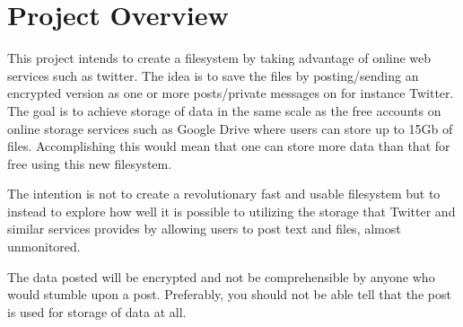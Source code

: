 \section{Project Overview}

This project intends to create a filesystem by taking advantage of online web services such as twitter. The idea is to save the files by posting/sending an encrypted version as one or more posts/private messages on for instance Twitter. The goal is to achieve storage of data in the same scale as the free accounts on online storage services such as Google Drive where users can store up to 15Gb of files. Accomplishing this would mean that one can store more data than that for free using this new filesystem.

The intention is not to create a revolutionary fast and usable filesystem but to instead to explore how well it is possible to utilizing the storage that Twitter and similar services provides by allowing users to post text and files, almost unmonitored.

The data posted will be encrypted and not be comprehensible by anyone who would stumble upon a post. Preferably, you should not be able tell that the post is used for storage of data at all. 